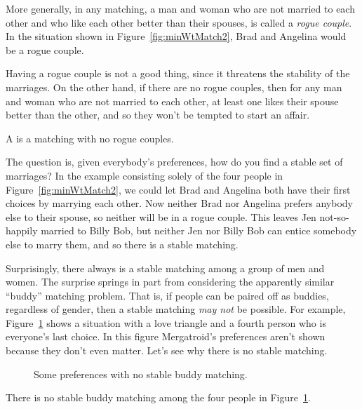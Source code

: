 More generally, in any matching, a man and woman who are not married
to each other and who like each other better than their spouses, is
called a \emph{rogue couple}.  In the situation shown in
Figure~\ref{fig:minWtMatch2}, Brad and Angelina would be a rogue
couple.

Having a rogue couple is not a good thing, since it threatens the
stability of the marriages.  On the other hand, if there are no rogue
couples, then for any man and woman who are not married to each other,
at least one likes their spouse better than the other, and so they
won't be tempted to start an affair.

\begin{definition}
  A  is a matching with no rogue couples.
\end{definition}

The question is, given everybody's preferences, how do you find a
stable set of marriages?  In the example consisting solely of the four
people in Figure~\ref{fig:minWtMatch2}, we could let Brad and Angelina
both have their first choices by marrying each other.  Now neither
Brad nor Angelina prefers anybody else to their spouse, so neither
will be in a rogue couple.  This leaves Jen not-so-happily married to
Billy Bob, but neither Jen nor Billy Bob can entice somebody else to
marry them, and so there is a stable matching.

Surprisingly, there always is a stable matching among a group of men
and women.  The surprise springs in part from considering the
apparently similar ``buddy'' matching problem.  That is, if people can
be paired off as buddies, regardless of gender, then a stable matching
\emph{may not} be possible.  For example, Figure~\ref{fig:buddy} shows
a situation with a love triangle and a fourth person who is everyone's
last choice.  In this figure Mergatroid's preferences aren't shown
because they don't even matter.  Let's see why there is no stable
matching.

\begin{figure}[htbp]


\caption{Some preferences with no stable buddy matching.}
\label{fig:buddy}
\end{figure}

\begin{lemma}\label{lem:nostablematch}
There is no stable buddy matching among the four people in
Figure~\ref{fig:buddy}.
\end{lemma}

